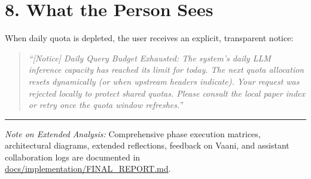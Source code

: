\documentclass[9pt,twocolumn]{article}
\begin{document}
\section{8. What the Person Sees}
When daily quota is depleted, the user receives an explicit, transparent notice:
\begin{quote}
\footnotesize
\textit{``[Notice] Daily Query Budget Exhausted: The system's daily LLM inference capacity has reached its limit for today. The next quota allocation resets dynamically (or when upstream headers indicate). Your request was rejected locally to protect shared quotas. Please consult the local paper index or retry once the quota window refreshes.''}
\end{quote}

\vspace{-2pt}
\hrule
\vspace{2pt}
{\tiny\textit{Note on Extended Analysis:} Comprehensive phase execution matrices, architectural diagrams, extended reflections, feedback on Vaani, and assistant collaboration logs are documented in \url{docs/implementation/FINAL_REPORT.md}.}
\end{document}
